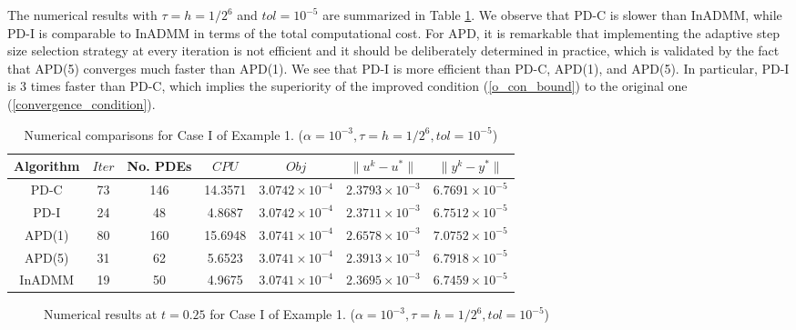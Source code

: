 \documentclass[final]{siamart171218}
\theoremstyle{remark}
\begin{document}
The numerical results with $\tau=h={1}/{2^6}$ and $tol=10^{-5}$ are summarized in Table \ref{result_case1_ex1}.  We observe that PD-C is slower than InADMM, while PD-I is comparable to InADMM in terms of the total computational cost.
For APD, it is remarkable that implementing the adaptive step size selection strategy at every iteration is not efficient and it should be deliberately determined in practice, which is validated by the fact that APD(5) converges much faster than APD(1). We see that PD-I is more efficient than PD-C, APD(1), and APD(5). In particular, PD-I is 3 times faster than PD-C, which implies the superiority of the improved condition (\ref{o_con_bound}) to the original one (\ref{convergence_condition}).
\begin{table}[htpb]
	\centering
	\caption{Numerical comparisons for Case I of Example 1. ($\alpha=10^{-3 }, \tau=h={1}/{2^6}, tol=10^{-5}$)}\label{result_case1_ex1}
	{\footnotesize\begin{tabular}{|c|c|c|c|c|c|c|}
			\hline
			Algorithm&$Iter$&No. PDEs&$CPU$&$Obj$&$\|u^k-u^*\|$&$\|y^k-y^*\|$\\
			\hline
			PD-C&73&146 &14.3571 &$3.0742\times 10^{-4}$ &$2.3793\times 10^{-3}$ &$6.7691\times 10^{-5}$\\
			\hline
			PD-I& 24&48 &4.8687&$3.0742\times 10^{-4}$ &$2.3711\times 10^{-3}$ &$6.7512\times 10^{-5}$\\
			\hline
			{APD}(1)& 80&160&15.6948&$3.0741\times 10^{-4}$ &$2.6578\times 10^{-3}$ &$7.0752\times 10^{-5}$\\
			\hline
			{APD}(5)& 31&62 &5.6523&$3.0741\times 10^{-4}$ &$2.3913\times 10^{-3}$ &$6.7918\times 10^{-5}$\\
			\hline
		    {InADMM}& 19&50 &4.9675&$ 3.0741\times 10^{-4}$ &$2.3695\times 10^{-3}$ &$6.7459\times 10^{-5}$\\
			\hline
		\end{tabular}
	}
\end{table}






\begin{figure}[htpb]
	\caption{Numerical results at $t=0.25$ for Case I of Example 1. ($\alpha=10^{-3}, \tau=h={1}/{2^6}, tol=10^{-5}$)}\label{numerical_resultu_ex1}
	\centering
\end{figure}
\end{document}
